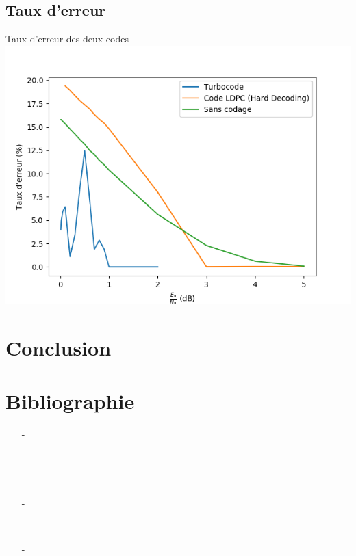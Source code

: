\documentclass[11pt]{beamer}
\begin{document}
\subsection{Taux d'erreur}


\begin{frame}{Taux d'erreur des deux codes}
	\centering
	\includegraphics[scale=0.6]{taux_erreur}
\end{frame}


\section*{Conclusion}



\appendix



\section{Bibliographie}

\begin{frame}[plain]
	\footnotesize
	\begin{itemize}
		\item[-] \cite{voyager}
		\item[-] \cite{shannon}
		\item[-] \cite{gallager}
		\item[-] \cite{turbocodes}
		\item[-] \cite{ccsds}
		\item[-] \cite{juno}
	\end{itemize}
\end{frame}
\end{document}
